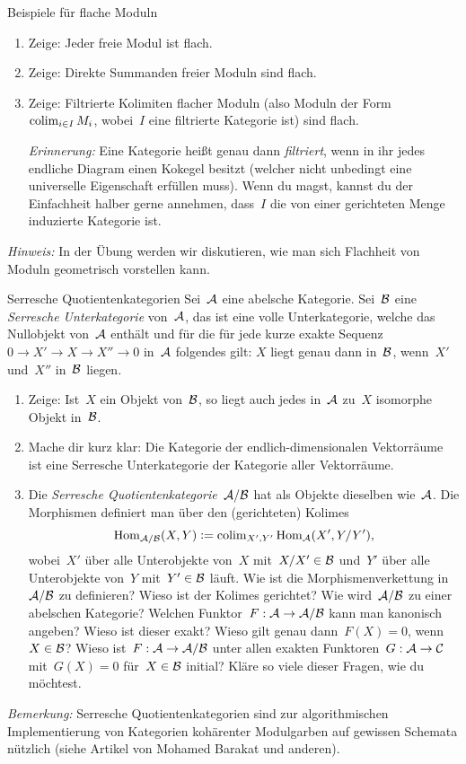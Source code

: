 \documentclass{uebblatt}
\begin{document}
\begin{aufgabe}{Beispiele für flache Moduln}
\begin{enumerate}
\item Zeige: Jeder freie Modul ist flach.
\item Zeige: Direkte Summanden freier Moduln sind flach.
\item Zeige: Filtrierte Kolimiten flacher Moduln (also Moduln der
Form~$\operatorname{colim}_{i \in I} M_i$, wobei~$I$ eine filtrierte Kategorie ist) sind flach.

\emph{Erinnerung:} Eine Kategorie heißt genau dann \emph{filtriert}, wenn in
ihr jedes endliche Diagram einen Kokegel besitzt (welcher nicht unbedingt eine
universelle Eigenschaft erfüllen muss). Wenn du magst, kannst du der
Einfachheit halber gerne annehmen, dass~$I$ die von einer gerichteten Menge
induzierte Kategorie ist.
\end{enumerate}
\emph{Hinweis:} In der Übung werden wir diskutieren, wie man sich Flachheit von
Moduln geometrisch vorstellen kann.
\end{aufgabe}

\newpage

\begin{aufgabe}{Serresche Quotientenkategorien}
Sei~$\mathcal{A}$ eine abelsche Kategorie. Sei~$\mathcal{B}$ eine \emph{Serresche Unterkategorie}
von~$\mathcal{A}$, das ist eine volle Unterkategorie, welche das Nullobjekt von~$\mathcal{A}$
enthält und für die für jede kurze exakte Sequenz~$0 \to X' \to X \to X'' \to 0$
in~$\mathcal{A}$ folgendes gilt: $X$ liegt genau dann in~$\mathcal{B}$, wenn~$X'$ und~$X''$
in~$\mathcal{B}$ liegen.
\begin{enumerate}
\item Zeige: Ist~$X$ ein Objekt von~$\mathcal{B}$, so liegt auch jedes in~$\mathcal{A}$ zu~$X$ isomorphe
Objekt in~$\mathcal{B}$.
\item Mache dir kurz klar: Die Kategorie der endlich-dimensionalen
Vektorräume ist eine Serresche Unterkategorie der Kategorie aller Vektorräume.
\item Die \emph{Serresche Quotientenkategorie}~$\mathcal{A}/\mathcal{B}$ hat als Objekte
dieselben wie~$\mathcal{A}$. Die Morphismen definiert man über den (gerichteten) Kolimes
\[ \mathrm{Hom}_{\mathcal{A}/\mathcal{B}}(X,Y) \vcentcolon= \operatorname{colim}_{X',Y'} \mathrm{Hom}_{\mathcal{A}}(X', Y/Y'), \]
wobei~$X'$ über alle Unterobjekte von~$X$ mit~$X/X' \in \mathcal{B}$ und~$Y'$ über alle
Unterobjekte von~$Y$ mit~$Y' \in \mathcal{B}$ läuft. Wie ist die Morphismenverkettung
in~$\mathcal{A}/\mathcal{B}$ zu definieren? Wieso ist der Kolimes gerichtet? Wie wird~$\mathcal{A}/\mathcal{B}$ zu einer abelschen Kategorie?
Welchen Funktor~$F : \mathcal{A} \to \mathcal{A}/\mathcal{B}$ kann man kanonisch angeben? Wieso ist dieser
exakt? Wieso gilt genau dann~$F(X) = 0$, wenn~$X \in \mathcal{B}$? Wieso ist~$F : \mathcal{A} \to
\mathcal{A}/\mathcal{B}$ unter allen exakten Funktoren~$G : \mathcal{A} \to \mathcal{C}$ mit~$G(X) = 0$ für~$X \in \mathcal{B}$
initial? Kläre so viele dieser Fragen, wie du möchtest.
\end{enumerate}
\emph{Bemerkung:} Serresche Quotientenkategorien sind zur algorithmischen
Implementierung von Kategorien kohärenter Modulgarben auf gewissen Schemata
nützlich (siehe Artikel von Mohamed Barakat und anderen).
\end{aufgabe}
\end{document}
